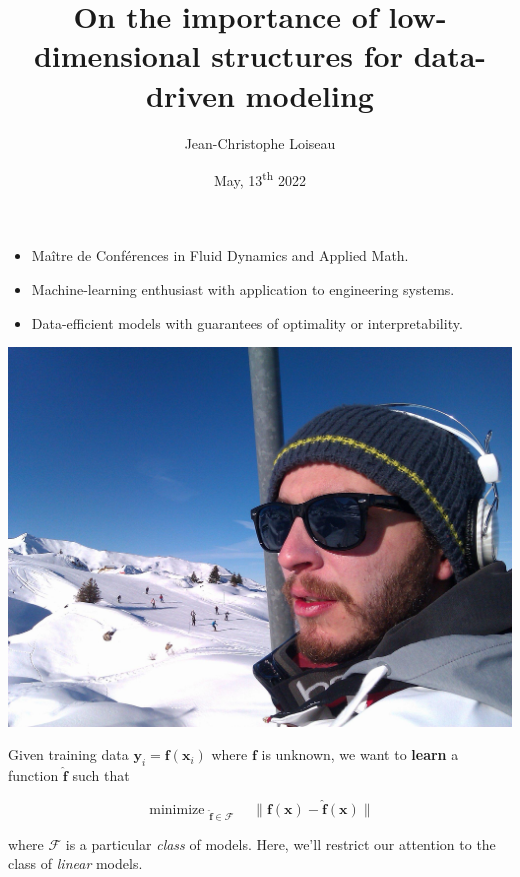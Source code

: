 \documentclass[aspectratio=169, usenames, dvipsnames]{beamer}
\title{On the importance of low-dimensional structures for data-driven modeling}
\author[JC]{Jean-Christophe Loiseau}
\date[]{May, 13\textsuperscript{th} 2022}
\DeclareMathOperator*{\minimize}{minimize~}
\begin{document}
\begin{frame}
  \titlepage
\end{frame}


\begin{frame}
  \vfill
  \begin{minipage}{.68\textwidth}
    \begin{itemize}
    \item Maître de Conférences in Fluid Dynamics and Applied Math.

      \bigskip

    \item Machine-learning enthusiast with application to engineering systems.

      \bigskip

    \item Data-efficient models with guarantees of optimality or interpretability.
    \end{itemize}
  \end{minipage}%
  \hfill
  \begin{minipage}{.28\textwidth}
    \includegraphics[width=\textwidth]{myself}
  \end{minipage}

  \vfill
\end{frame}

\begin{frame}
  \vfill

  Given training data $\bm{y}_i = \bm{f}(\bm{x}_i)$ where $\bm{f}$ is unknown, we want to \textbf{learn} a function $\hat{\bm{f}}$ such that

  \bigskip
{\Large
  \[
  \minimize_{\hat{\bm{f}} \in \mathcal{F}} \quad \| \bm{f}(\bm{x}) - \hat{\bm{f}}(\bm{x}) \|
  \]
}

  \bigskip

  where $\mathcal{F}$ is a particular \emph{class} of models.
  Here, we'll restrict our attention to the class of \emph{linear} models.

  \vfill
\end{frame}
\end{document}
